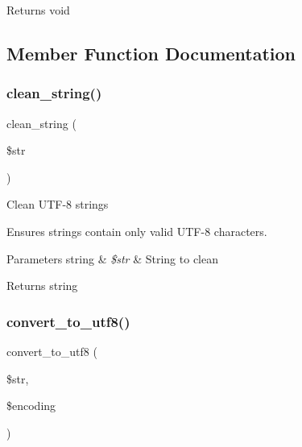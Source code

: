 \begin{DoxyReturn}{Returns}
void 
\end{DoxyReturn}


\subsection{Member Function Documentation}
\mbox{\label{class_c_i___utf8_af9fc6214803042dd0b46d6ac5bdb4b7b}} 
\subsubsection{\texorpdfstring{clean\+\_\+string()}{clean\_string()}}
{\footnotesize\ttfamily clean\+\_\+string (\begin{DoxyParamCaption}\item[{}]{\$str }\end{DoxyParamCaption})}

Clean U\+T\+F-\/8 strings

Ensures strings contain only valid U\+T\+F-\/8 characters.


\begin{DoxyParams}[1]{Parameters}
string & {\em \$str} & String to clean \\
\hline
\end{DoxyParams}
\begin{DoxyReturn}{Returns}
string 
\end{DoxyReturn}
\mbox{\label{class_c_i___utf8_a7f6a8b9f00d7d11b23abcadfc91e9583}} 
\subsubsection{\texorpdfstring{convert\+\_\+to\+\_\+utf8()}{convert\_to\_utf8()}}
{\footnotesize\ttfamily convert\+\_\+to\+\_\+utf8 (\begin{DoxyParamCaption}\item[{}]{\$str,  }\item[{}]{\$encoding }\end{DoxyParamCaption})}

